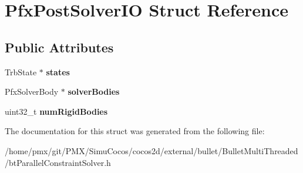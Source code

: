 \hypertarget{structPfxPostSolverIO}{}\section{Pfx\+Post\+Solver\+IO Struct Reference}
\label{structPfxPostSolverIO}
\subsection*{Public Attributes}
\begin{DoxyCompactItemize}
\item 
\mbox{\label{structPfxPostSolverIO_a754dea2b02e6b6304557772e2e3f96e4}} 
Trb\+State $\ast$ {\bfseries states}
\item 
\mbox{\label{structPfxPostSolverIO_a9de2cecc83204661b733fa017f3ec10e}} 
Pfx\+Solver\+Body $\ast$ {\bfseries solver\+Bodies}
\item 
\mbox{\label{structPfxPostSolverIO_ae952e4b6a5768e9c5d754693d7457aff}} 
uint32\+\_\+t {\bfseries num\+Rigid\+Bodies}
\end{DoxyCompactItemize}


The documentation for this struct was generated from the following file\+:\begin{DoxyCompactItemize}
\item 
/home/pmx/git/\+P\+M\+X/\+Simu\+Cocos/cocos2d/external/bullet/\+Bullet\+Multi\+Threaded/bt\+Parallel\+Constraint\+Solver.\+h\end{DoxyCompactItemize}
